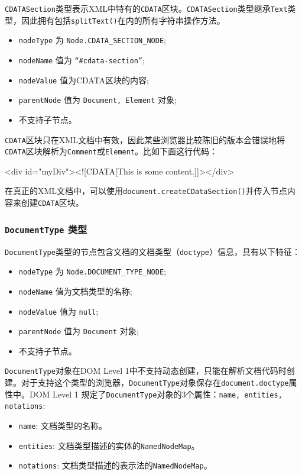 \texttt{CDATASection}类型表示XML中特有的\texttt{CDATA}区块。\texttt{CDATASection}类型继承\texttt{Text}类型，因此拥有包括\texttt{splitText()}在内的所有字符串操作方法。

\begin{itemize}
    \item \texttt{nodeType} 为 \texttt{Node.CDATA\_SECTION\_NODE};
    \item \texttt{nodeName} 值为 \texttt{``\#cdata-section''};
    \item \texttt{nodeValue} 值为CDATA区块的内容;
    \item \texttt{parentNode} 值为 \texttt{Document, Element} 对象;
    \item 不支持子节点。
\end{itemize}

\texttt{CDATA}区块只在XML文档中有效，因此某些浏览器比较陈旧的版本会错误地将\texttt{CDATA}区块解析为\texttt{Comment}或\texttt{Element}。比如下面这行代码：

\begin{HTML}
<div id="myDiv"><![CDATA[This is some content.]]></div> 
\end{HTML}

在真正的XML文档中，可以使用\texttt{document.createCDataSection()}并传入节点内容来创建\texttt{CDATA}区块。

\subsubsection*{\texttt{DocumentType} 类型}

\texttt{DocumentType}类型的节点包含文档的文档类型（\texttt{doctype}）信息，具有以下特征：
\begin{itemize}
    \item \texttt{nodeType} 为 \texttt{Node.DOCUMENT\_TYPE\_NODE};
    \item \texttt{nodeName} 值为文档类型的名称;
    \item \texttt{nodeValue} 值为 \texttt{null};
    \item \texttt{parentNode} 值为 \texttt{Document} 对象;
    \item 不支持子节点。
\end{itemize}

\texttt{DocumentType}对象在DOM Level 1中不支持动态创建，只能在解析文档代码时创建。对于支持这个类型的浏览器，\texttt{DocumentType}对象保存在\texttt{document.doctype}属性中。DOM Level 1 规定了\texttt{DocumentType}对象的3个属性：\texttt{name, entities, notations}:
\begin{itemize}
    \item \texttt{name}: 文档类型的名称。
    \item \texttt{entities}: 文档类型描述的实体的\texttt{NamedNodeMap}。
    \item \texttt{notations}: 文档类型描述的表示法的\texttt{NamedNodeMap}。
\end{itemize}

